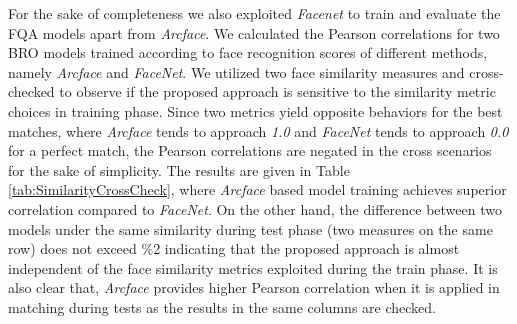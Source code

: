 \documentclass[runningheads]{llncs}
\begin{document}
For the sake of completeness we also exploited \textit{Facenet} \cite{facenet} to train and evaluate the FQA models apart from \textit{Arcface}. We calculated the Pearson correlations for two BRO models trained according to face recognition scores of different methods, namely \textit{Arcface} and \textit{FaceNet}. We utilized two face similarity measures and cross-checked to observe if the proposed approach is sensitive to the similarity metric choices in training phase. Since two metrics yield opposite behaviors for the best matches, where \textit{Arcface} tends to approach \textit{1.0} and \textit{FaceNet} tends to approach \textit{0.0} for a perfect match, the Pearson correlations are negated in the cross scenarios for the sake of simplicity. The results are given in Table \ref{tab:SimilarityCrossCheck}, where \textit{Arcface} based model training achieves superior correlation compared to \textit{FaceNet}. On the other hand, the difference between two models under the same similarity during test phase (two measures on the same row) does not exceed \%2 indicating that the proposed approach is almost independent of the face similarity metrics exploited during the train phase. It is also clear that, \textit{Arcface} provides higher Pearson correlation when it is applied in matching during tests as the results in the same columns are checked.       
\end{document}
